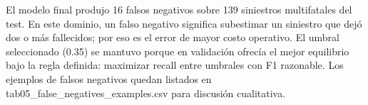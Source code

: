 El modelo final produjo 16 falsos negativos sobre 139 siniestros multifatales del test. En este dominio, un falso negativo significa subestimar un siniestro que dejó dos o más fallecidos; por eso es el error de mayor costo operativo. El umbral seleccionado (0.35) se mantuvo porque en validación ofrecía el mejor equilibrio bajo la regla definida: maximizar recall entre umbrales con F1 razonable. Los ejemplos de falsos negativos quedan listados en tab05_false_negatives_examples.csv para discusión cualitativa.
